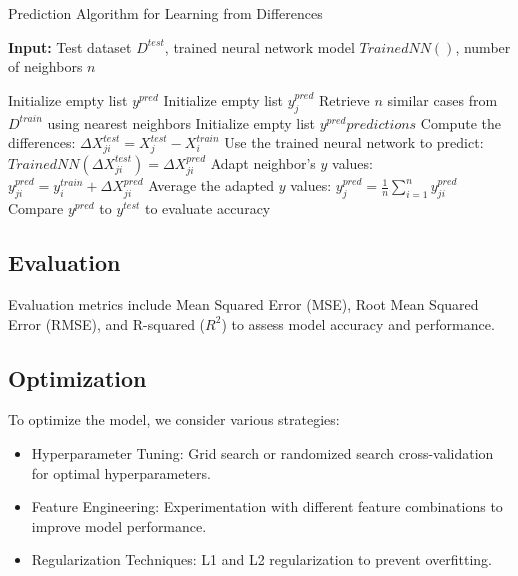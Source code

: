 \documentclass[a4paper, 12pt]{report}
\begin{document}
\begin{algorithm}
    \caption{Prediction Algorithm for Learning from Differences}
	\textbf{Input:} Test dataset $D^{test}$, trained neural network model $Trained NN()$, number of neighbors $n$
    \label{alg:learning_from_differences_predict}
    \begin{algorithmic}
        \State Initialize empty list $y^{pred}$
            \State Initialize empty list $y^{pred}_j$
            \State Retrieve $n$ similar cases from $D^{train}$ using nearest neighbors
			\State Initialize empty list $y^{pred}predictions$
                \State Compute the differences: $\Delta X^{test}_{ji} = X^{test}_j - X^{train}_i$
                \State Use the trained neural network to predict: $Trained NN(\Delta X^{test}_{ji}) = {\Delta X^{pred}_{ji}}$
                \State Adapt neighbor's $y$ values: $y^{pred}_{ji} = y^{train}_i + \Delta X^{pred}_{ji}$
            \EndFor
            \State Average the adapted $y$ values: $y^{pred}_j = \frac{1}{n} \sum_{i=1}^{n} y^{pred}_{ji}$
        \EndFor
		\State Compare $y^{pred}$ to $y^{test}$ to evaluate accuracy
    \end{algorithmic}
\end{algorithm}

\subsection{Evaluation}
Evaluation metrics include Mean Squared Error (MSE), Root Mean Squared Error (RMSE), and R-squared ($R^2$) to assess model accuracy and performance.

\subsection{Optimization}
To optimize the model, we consider various strategies:
\begin{itemize}
    \item Hyperparameter Tuning: Grid search or randomized search cross-validation for optimal hyperparameters.
    \item Feature Engineering: Experimentation with different feature combinations to improve model performance.
    \item Regularization Techniques: L1 and L2 regularization to prevent overfitting.
\end{itemize}
\end{document}
